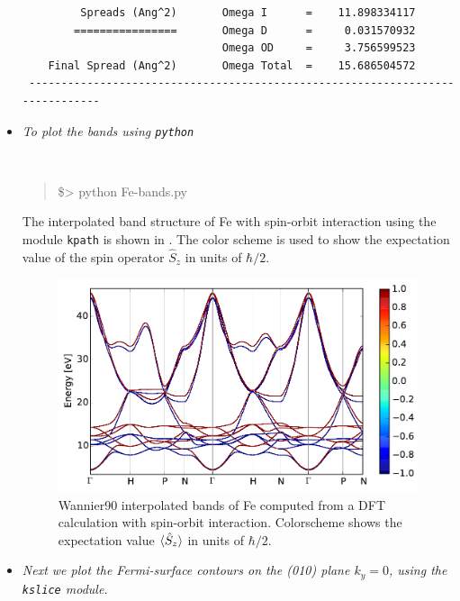 \begin{itemize}
\begin{tcolorbox}[sharp corners,boxrule=0.5pt]
{\begin{verbatim}
         Spreads (Ang^2)       Omega I      =    11.898334117
        ================       Omega D      =     0.031570932
                               Omega OD     =     3.756599523
    Final Spread (Ang^2)       Omega Total  =    15.686504572
 ------------------------------------------------------------------------------
	\end{verbatim}
	}
	\end{tcolorbox}
	\item[] {\it To plot the bands using {\tt python}}
	{\tt
	\begin{quote}
	\$> python Fe-bands.py 
	\end{quote}
	}
	The interpolated band structure of Fe with spin-orbit interaction using the module {\tt kpath} is shown in . The color scheme is used to show the expectation value of the spin operator $\hat{S}_z$ in units of $\hbar/2$.
	\begin{figure}[h!]
	\centering
	\includegraphics[width=0.6\columnwidth]{figure/example17/Fe_bandstructure.pdf}
	\caption{Wannier90 interpolated bands of Fe computed from a DFT calculation with spin-orbit interaction. Colorscheme shows the expectation value $\braket{\hat{S}_z}$ in units of $\hbar/2$.}\label{fig17.1}
	\end{figure}
	\item[]{\it Next we plot the Fermi-surface contours on the (010) plane $k_y = 0$, using the {\tt kslice} module.}


\end{itemize}
